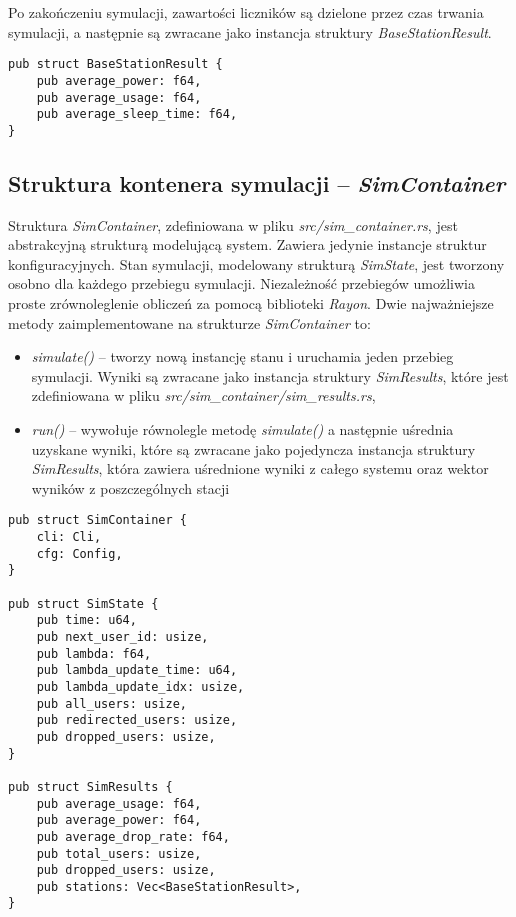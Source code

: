 \noindent Po zakończeniu symulacji, zawartości liczników są dzielone przez czas trwania symulacji, a następnie są zwracane jako instancja struktury \emph{BaseStationResult}.
{
\selectfont 
\begin{verbatim}
pub struct BaseStationResult {
    pub average_power: f64,
    pub average_usage: f64,
    pub average_sleep_time: f64,
}
\end{verbatim}
}

\subsection{Struktura kontenera symulacji -- \emph{SimContainer}}
Struktura \emph{SimContainer}, zdefiniowana w pliku \emph{src/sim\_container.rs}, jest abstrakcyjną strukturą modelującą system. Zawiera jedynie instancje struktur konfiguracyjnych. Stan symulacji, modelowany strukturą \emph{SimState}, jest tworzony osobno dla każdego przebiegu symulacji. Niezależność przebiegów umożliwia proste zrównoleglenie obliczeń za pomocą biblioteki \emph{Rayon}. Dwie najważniejsze metody zaimplementowane na strukturze \emph{SimContainer} to:
\begin{itemize}
\item \emph{simulate()} -- tworzy nową instancję stanu i uruchamia jeden przebieg symulacji. Wyniki są zwracane jako instancja struktury \emph{SimResults}, które jest zdefiniowana w pliku \emph{src/sim\_container/sim\_results.rs},
\item \emph{run()} -- wywołuje równolegle metodę \emph{simulate()} a następnie uśrednia uzyskane wyniki, które są zwracane jako pojedyncza instancja struktury \emph{SimResults}, która zawiera uśrednione wyniki z całego systemu oraz wektor wyników z poszczególnych stacji
\end{itemize}
{
\selectfont 
\begin{verbatim}
pub struct SimContainer {
    cli: Cli,
    cfg: Config,
}

pub struct SimState {
    pub time: u64,
    pub next_user_id: usize,
    pub lambda: f64,
    pub lambda_update_time: u64,
    pub lambda_update_idx: usize,
    pub all_users: usize,
    pub redirected_users: usize,
    pub dropped_users: usize,
}

pub struct SimResults {
    pub average_usage: f64,
    pub average_power: f64,
    pub average_drop_rate: f64,
    pub total_users: usize,
    pub dropped_users: usize,
    pub stations: Vec<BaseStationResult>,
}
\end{verbatim}
}
